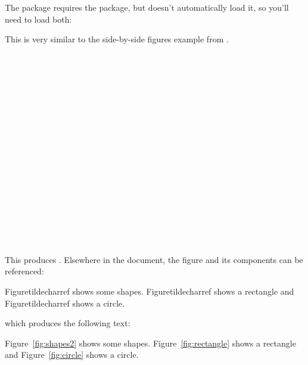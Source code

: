 The  package requires the  package,
but doesn't automatically load it, so you'll need to load
both:\reportpagebreak
\begin{codeS}
\end{codeS}


This is very similar to the side-by-side figures example from
.
 
\begin{code}[0.9\linewidth]
\newline
\strut~\newline
\strut~~\newline
\strut~~\newline
\strut~~\newline
\strut~\newline
{}\newline
\strut~\newline
\strut~~\newline
\strut~~\newline
\strut~~\newline
\strut~\newline
{}\newline
{}\newline
{}
\end{code}

This produces .
Elsewhere in the document, the figure and its components can be
referenced:
\begin{code}
Figure\gls{tildechar}\gls{ref} shows some shapes.  
Figure\gls{tildechar}\gls{ref} shows a rectangle and 
Figure\gls{tildechar}\gls{ref} shows a circle.
\end{code}
which produces the following text:
\begin{result}
Figure~\ref*{fig:shapes2} shows some shapes.
Figure~\ref*{fig:rectangle} shows a rectangle and
Figure~\ref*{fig:circle} shows a circle.\relax
\end{result}


